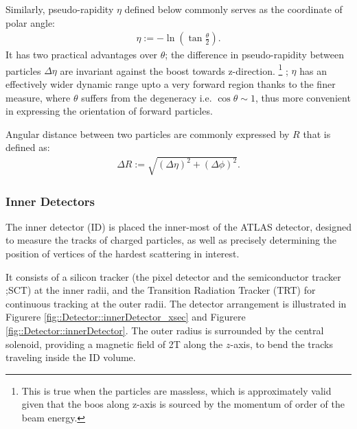 Similarly, pseudo-rapidity $\eta$ defined below commonly serves as the coordinate of polar angle:
\begin{align}
\eta := -\ln \left( \tan{\frac{\theta}{2}} \right).
\end{align}
It has two practical advantages over $\theta$; the difference in pseudo-rapidity between particles $\Delta\eta$ are invariant against the boost towards z-direction. 
\footnote{
This is true when the particles are massless, which is approximately valid given that the boos along z-axis is sourced by the momentum of order of the beam energy.}
; $\eta$ has an effectively wider dynamic range upto a very forward region thanks to the finer measure, where $\theta$ suffers from the degeneracy i.e. $\cos{\theta}\sim 1$, thus more convenient in expressing the orientation of forward particles.

Angular distance between two particles are commonly expressed by $R$ that is defined as: 
\begin{align}
\Delta R := \sqrt{(\Delta\eta)^2+(\Delta\phi)^2}.
\end{align}



\subsubsection{Inner Detectors}
The inner detector (ID) is placed the inner-most of the ATLAS detector, designed to measure the tracks of charged particles, 
as well as precisely determining the position of vertices of the hardest scattering in interest.

It consists of a silicon tracker (the pixel detector and the semiconductor tracker ;SCT) at the inner radii,
and the Transition Radiation Tracker (TRT) for continuous tracking at the outer radii. 
The detector arrangement is illustrated in Figurere \ref{fig::Detector::innerDetector_xsec} and Figurere \ref{fig::Detector::innerDetector}.
The outer radius is surrounded by the central solenoid, providing a magnetic field of 2T along the $z$-axis,
to bend the tracks traveling inside the ID volume.

